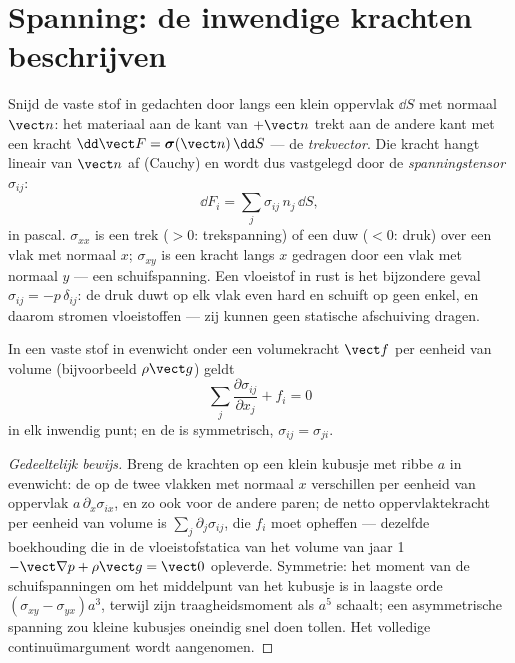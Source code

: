 \section{Spanning: de inwendige krachten beschrijven}

\begin{definition}\label{def:b3:continuum-elasticity:stress}
Snijd de vaste stof in gedachten door langs een klein oppervlak $\dd S$
met normaal $\vect n$: het materiaal aan de kant van $+\vect n$ trekt aan
de andere kant met een kracht $\dd\vect F = \boldsymbol\sigma(\vect n)\,\dd S$ --- de \emph{trekvector}. Die kracht hangt lineair van $\vect n$ af (Cauchy) en wordt dus vastgelegd door de \emph{spanningstensor}
$\sigma_{ij}$:
\[
\dd F_i = \sum_j \sigma_{ij}\,n_j\,\dd S ,
\]
in pascal. $\sigma_{xx}$ is een trek ($> 0$: trekspanning) of een duw
($< 0$: druk) over een vlak met normaal $x$; $\sigma_{xy}$ is een kracht
langs $x$ gedragen door een vlak met normaal $y$ --- een
schuifspanning. Een vloeistof in rust is het bijzondere geval
$\sigma_{ij} = -p\,\delta_{ij}$: de druk duwt op elk vlak even hard en
schuift op geen enkel, en daarom stromen vloeistoffen --- zij kunnen geen
statische afschuiving dragen.
\end{definition}

\begin{proposition}\label{prop:b3:continuum-elasticity:equilibrium}
In een vaste stof in evenwicht onder een volumekracht $\vect f$ per
eenheid van volume (bijvoorbeeld $\rho\vect g$) geldt
\[
\sum_j\frac{\partial\sigma_{ij}}{\partial x_j} + f_i = 0
\]
in elk inwendig punt; en de  is symmetrisch,
$\sigma_{ij} = \sigma_{ji}$.
\end{proposition}

\begin{proof}[Gedeeltelijk bewijs]
Breng de krachten op een klein kubusje met ribbe $a$ in evenwicht: de
 op de twee vlakken met normaal $x$ verschillen per eenheid
van oppervlak $a\,\partial_x\sigma_{ix}$, en zo ook voor de andere paren;
de netto oppervlaktekracht per eenheid van volume is
$\sum_j\partial_j\sigma_{ij}$, die $f_i$ moet opheffen --- dezelfde
boekhouding die in de vloeistofstatica van het volume van jaar 1
$-\vect\nabla p + \rho\vect g = \vect 0$ opleverde. Symmetrie: het moment
van de schuifspanningen om het middelpunt van het kubusje is in laagste
orde $(\sigma_{xy} -
\sigma_{yx})a^3$, terwijl zijn traagheidsmoment als
$a^5$ schaalt; een asymmetrische spanning zou kleine kubusjes oneindig
snel doen tollen. Het volledige continuümargument wordt aangenomen.
\end{proof}

